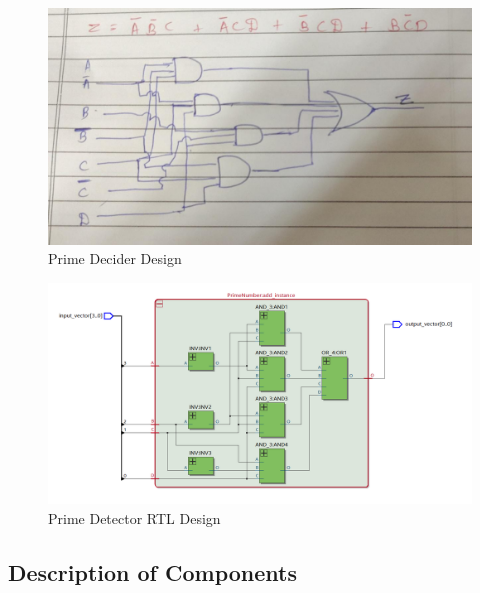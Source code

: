 \documentclass[12pt]{article}
\begin{document}
\begin{figure}[H]
\centering
  \includegraphics[scale=0.3]{Images/PrimeNumber_Design.jpeg}
  \caption{Prime Decider Design}
\end{figure}

\begin{figure}[H]
\centering
  \includegraphics[scale=0.3]{Images/PrimeNumber_RTLViewer.png}
  \caption{Prime Detector RTL Design}
\end{figure}

\subsection{Description of Components}
\end{document}
